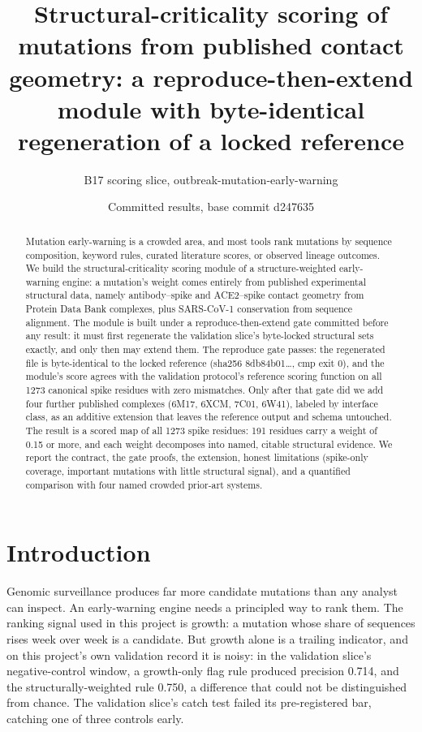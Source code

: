 \documentclass[11pt]{article}
\title{Structural-criticality scoring of mutations from published contact geometry: a reproduce-then-extend module with byte-identical regeneration of a locked reference}
\author{B17 scoring slice, outbreak-mutation-early-warning}
\date{Committed results, base commit d247635}
\begin{document}
\maketitle
\begin{abstract}
Mutation early-warning is a crowded area, and most tools rank mutations by sequence composition, keyword rules, curated literature scores, or observed lineage outcomes. We build the structural-criticality scoring module of a structure-weighted early-warning engine: a mutation's weight comes entirely from published experimental structural data, namely antibody--spike and ACE2--spike contact geometry from Protein Data Bank complexes, plus SARS-CoV-1 conservation from sequence alignment. The module is built under a reproduce-then-extend gate committed before any result: it must first regenerate the validation slice's byte-locked structural sets exactly, and only then may extend them. The reproduce gate passes: the regenerated file is byte-identical to the locked reference (sha256 8db84b01\ldots, cmp exit 0), and the module's score agrees with the validation protocol's reference scoring function on all 1273 canonical spike residues with zero mismatches. Only after that gate did we add four further published complexes (6M17, 6XCM, 7C01, 6W41), labeled by interface class, as an additive extension that leaves the reference output and schema untouched. The result is a scored map of all 1273 spike residues: 191 residues carry a weight of 0.15 or more, and each weight decomposes into named, citable structural evidence. We report the contract, the gate proofs, the extension, honest limitations (spike-only coverage, important mutations with little structural signal), and a quantified comparison with four named crowded prior-art systems.
\end{abstract}

\section{Introduction}
Genomic surveillance produces far more candidate mutations than any analyst can inspect. An early-warning engine needs a principled way to rank them. The ranking signal used in this project is growth: a mutation whose share of sequences rises week over week is a candidate. But growth alone is a trailing indicator, and on this project's own validation record it is noisy: in the validation slice's negative-control window, a growth-only flag rule produced precision 0.714, and the structurally-weighted rule 0.750, a difference that could not be distinguished from chance. The validation slice's catch test failed its pre-registered bar, catching one of three controls early.
\end{document}
